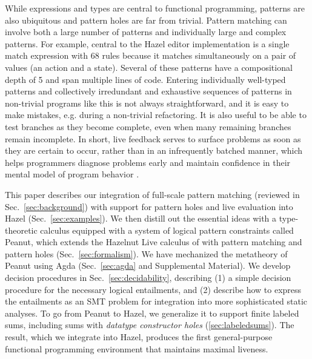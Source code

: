 While expressions and types are central to functional programming, patterns are also ubiquitous and pattern holes are far from trivial. Pattern matching can involve both a large number of patterns and individually large and complex patterns. For example, central to the Hazel editor implementation is a single match expression with 68 rules because it matches simultaneously on a pair of values (an action and a state). Several of these patterns have a compositional depth of 5 and span multiple lines of code. Entering individually well-typed patterns and collectively irredundant and exhaustive sequences of patterns in non-trivial programs like this is not always straightforward, and it is easy to make mistakes, e.g. during a non-trivial refactoring. It is also useful to be able to test branches as they become complete, even when many remaining branches remain incomplete. In short, live feedback serves to surface problems as soon as they are certain to occur, rather than in an infrequently batched manner, which helps programmers diagnose problems early and maintain confidence in their mental model of program behavior \cite{tanimoto2013perspective}.

This paper describes our integration of full-scale pattern matching (reviewed in Sec.~\ref{sec:background}) with support for pattern holes and live evaluation into Hazel (Sec.~\ref{sec:examples}). We then distill out the essential ideas with a type-theoretic calculus equipped with a system of logical pattern constraints called Peanut, which extends the Hazelnut Live calculus of \citet{DBLP:journals/pacmpl/OmarVCH19} with pattern matching and pattern holes (Sec.~\ref{sec:formalism}). We have mechanized the metatheory of Peanut using Agda (Sec.~\ref{sec:agda} and Supplemental Material). We develop decision procedures in Sec.~\ref{sec:decidability}, describing (1) a simple decision procedure for the necessary logical entailments, and (2) describe how to express the entailments as an SMT problem for integration into more sophisticated static analyses. To go from Peanut to Hazel, we generalize it to support finite labeled sums, including sums with \emph{datatype constructor holes} (\autoref{sec:labeledsums}). The result, which we integrate into Hazel, produces the first general-purpose functional programming environment that maintains maximal liveness.

